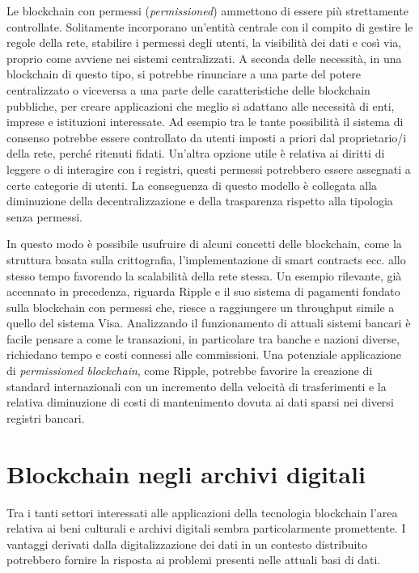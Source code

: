 Le blockchain con permessi (\emph{permissioned}) ammettono di essere più strettamente controllate. Solitamente incorporano un’entità centrale con il compito di gestire le regole della rete, stabilire i permessi degli utenti, la visibilità dei dati e così via, proprio come avviene nei sistemi centralizzati. A seconda delle necessità, in una blockchain di questo tipo, si potrebbe rinunciare a una parte del potere centralizzato o viceversa a una parte delle caratteristiche delle blockchain pubbliche, per creare applicazioni che meglio si adattano alle necessità di enti, imprese e istituzioni interessate. Ad esempio tra le tante possibilità il sistema di consenso potrebbe essere controllato da utenti imposti a priori dal proprietario/i della rete, perché ritenuti fidati. Un'altra opzione utile è relativa ai diritti di leggere o di interagire con i registri, questi permessi potrebbero essere assegnati a certe categorie di utenti. La conseguenza di questo modello è collegata alla diminuzione della decentralizzazione e della trasparenza rispetto alla tipologia senza permessi.

In questo modo è possibile usufruire di alcuni concetti delle blockchain, come la struttura basata sulla crittografia, l’implementazione di smart contracts ecc. allo stesso tempo favorendo la scalabilità della rete stessa. Un esempio rilevante, già accennato in precedenza, riguarda Ripple e il suo sistema di pagamenti fondato sulla blockchain con permessi che, riesce a raggiungere un throughput simile a quello del sistema Visa. Analizzando il funzionamento di attuali sistemi bancari è facile pensare a come le transazioni, in particolare tra banche e nazioni diverse, richiedano tempo e costi connessi alle commissioni. Una potenziale applicazione di \emph{permissioned blockchain}, come Ripple, potrebbe favorire la creazione di standard internazionali con un incremento della velocità di trasferimenti e la relativa diminuzione di costi di mantenimento dovuta ai dati sparsi nei diversi registri bancari.

\section{Blockchain negli archivi digitali} %
\label{sectionDigitalArchives}

Tra i tanti settori interessati alle applicazioni della tecnologia blockchain l’area relativa ai beni culturali e archivi digitali sembra particolarmente promettente. I vantaggi derivati dalla digitalizzazione dei dati in un contesto distribuito potrebbero fornire la risposta ai problemi presenti nelle attuali basi di dati.

